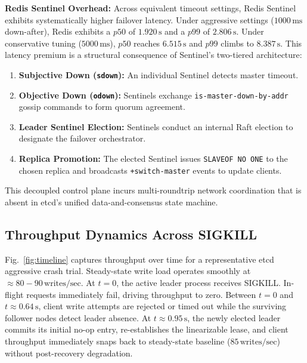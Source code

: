 \documentclass[conference]{IEEEtran}
\begin{document}
\textbf{Redis Sentinel Overhead:} Across equivalent timeout settings, Redis Sentinel exhibits systematically higher failover latency. Under aggressive settings ($1000\,\text{ms}$ down-after), Redis exhibits a $p50$ of $1.920\,\text{s}$ and a $p99$ of $2.806\,\text{s}$. Under conservative tuning ($5000\,\text{ms}$), $p50$ reaches $6.515\,\text{s}$ and $p99$ climbs to $8.387\,\text{s}$. This latency premium is a structural consequence of Sentinel's two-tiered architecture:
\begin{enumerate}
    \item \textbf{Subjective Down (\texttt{sdown}):} An individual Sentinel detects master timeout.
    \item \textbf{Objective Down (\texttt{odown}):} Sentinels exchange \texttt{is-master-down-by-addr} gossip commands to form quorum agreement.
    \item \textbf{Leader Sentinel Election:} Sentinels conduct an internal Raft election to designate the failover orchestrator.
    \item \textbf{Replica Promotion:} The elected Sentinel issues \texttt{SLAVEOF NO ONE} to the chosen replica and broadcasts \texttt{+switch-master} events to update clients.
\end{enumerate}
This decoupled control plane incurs multi-roundtrip network coordination that is absent in etcd's unified data-and-consensus state machine.

\subsection{Throughput Dynamics Across SIGKILL}
Fig.~\ref{fig:timeline} captures throughput over time for a representative etcd aggressive crash trial. Steady-state write load operates smoothly at $\approx 80-90\,\text{writes/sec}$. At $t=0$, the active leader process receives SIGKILL. In-flight requests immediately fail, driving throughput to zero. Between $t=0$ and $t \approx 0.64\,\text{s}$, client write attempts are rejected or timed out while the surviving follower nodes detect leader absence. At $t \approx 0.95\,\text{s}$, the newly elected leader commits its initial no-op entry, re-establishes the linearizable lease, and client throughput immediately snaps back to steady-state baseline ($85\,\text{writes/sec}$) without post-recovery degradation.
\end{document}
